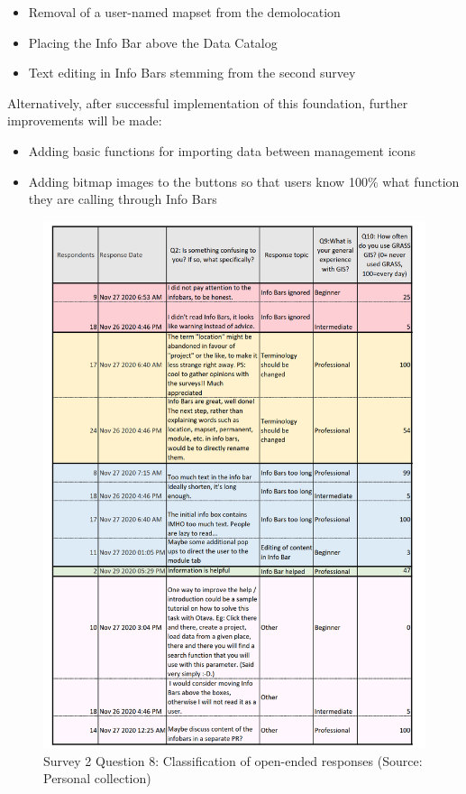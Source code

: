 \documentclass[a4paper,10pt,twoside]{article}
\begin{document}
\begin{itemize}
\item Removal of a user-named mapset from the demolocation
\item Placing the Info Bar above the Data Catalog
\item Text editing in Info Bars stemming from the second survey
\end {itemize}

\noindent Alternatively, after successful implementation of this foundation, further improvements will be made:

\begin {itemize}
\item Adding basic functions for importing data between management icons
\item Adding bitmap images to the buttons so that users know 100\% what function they are calling through Info Bars
\end {itemize}

\newpage
\begin{figure}[hbt!] 
\begin{center}
\includegraphics[width=15cm]{../surveys/analyzed_data/survey2_question8.png} 
\caption[Survey 2 Question 8: Classification of open-ended responses]{Survey 2 Question 8: Classification of open-ended responses (Source: Personal collection)}
\label{fig:survey2_question8}
\end{center}
\end{figure}
\end{document}
